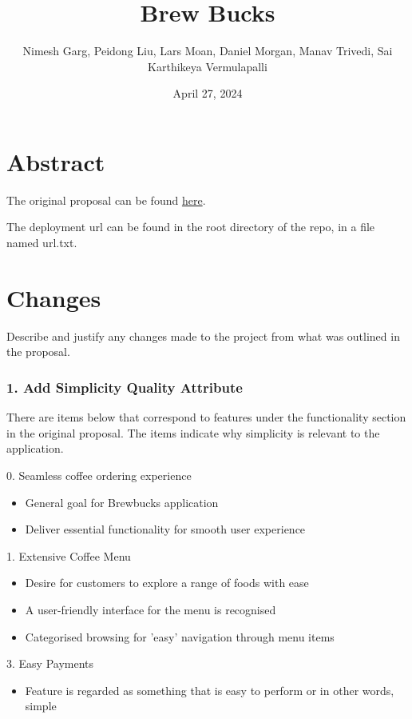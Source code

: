 \documentclass{article}
\title{Brew Bucks}
\author{Nimesh Garg, Peidong Liu, Lars Moan, Daniel Morgan, Manav Trivedi, Sai Karthikeya Vermulapalli}
\date{April 27, 2024}
\begin{document}
\maketitle
\pagebreak

\tableofcontents
\pagebreak

\section{Abstract}
The original proposal can be found \href{https://csse6400.github.io/project-proposal-2024/s4780791/proposal.html}{here}.

\medskip \noindent The deployment url can be found in the root directory of the repo, in a file named url.txt.

\section{Changes}
Describe and justify any changes made to the project from what was outlined in the proposal.

\subsubsection*{1. Add Simplicity Quality Attribute}
There are items below that correspond to features under the functionality section in the original proposal. The items indicate why simplicity is relevant to the application.

\medskip \begin{minipage}{\dimexpr\textwidth-0.25cm}
0. Seamless coffee ordering experience
\begin{itemize}
    \item General goal for Brewbucks application
    \item Deliver essential functionality for smooth user experience
\end{itemize}

1. Extensive Coffee Menu 
\begin{itemize}
    \item Desire for customers to explore a range of foods with ease
    \item A user-friendly interface for the menu is recognised
    \item Categorised browsing for 'easy' navigation through menu items
\end{itemize}

3. Easy Payments
\begin{itemize}
    \item Feature is regarded as something that is easy to perform or in other words, simple
\end{itemize}
\end{minipage}
\end{document}
